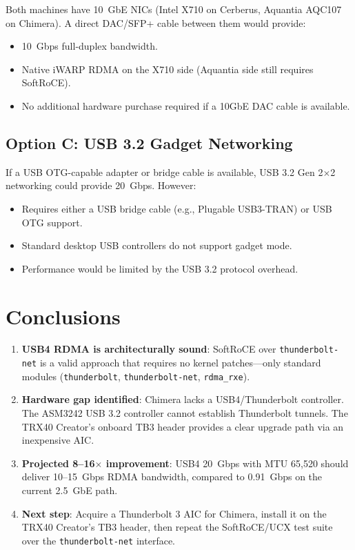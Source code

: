 \documentclass[11pt,letterpaper]{article}
\begin{document}
Both machines have 10~GbE NICs (Intel X710 on Cerberus, Aquantia AQC107 on Chimera). A direct DAC/SFP+ cable between them would provide:

\begin{itemize}
    \item 10~Gbps full-duplex bandwidth.
    \item Native iWARP RDMA on the X710 side (Aquantia side still requires SoftRoCE).
    \item No additional hardware purchase required if a 10GbE DAC cable is available.
\end{itemize}

\subsection{Option C: USB 3.2 Gadget Networking}

If a USB OTG-capable adapter or bridge cable is available, USB 3.2 Gen 2$\times$2 networking could provide 20~Gbps. However:
\begin{itemize}
    \item Requires either a USB bridge cable (e.g., Plugable USB3-TRAN) or USB OTG support.
    \item Standard desktop USB controllers do not support gadget mode.
    \item Performance would be limited by the USB 3.2 protocol overhead.
\end{itemize}

\section{Conclusions}

\begin{enumerate}
    \item \textbf{USB4 RDMA is architecturally sound}: SoftRoCE over \texttt{thunderbolt-net} is a valid approach that requires no kernel patches---only standard modules (\texttt{thunderbolt}, \texttt{thunderbolt-net}, \texttt{rdma\_rxe}).

    \item \textbf{Hardware gap identified}: Chimera lacks a USB4/Thunderbolt controller. The ASM3242 USB 3.2 controller cannot establish Thunderbolt tunnels. The TRX40 Creator's onboard TB3 header provides a clear upgrade path via an inexpensive AIC.

    \item \textbf{Projected 8--16$\times$ improvement}: USB4 20~Gbps with MTU 65,520 should deliver 10--15~Gbps RDMA bandwidth, compared to 0.91~Gbps on the current 2.5~GbE path.

    \item \textbf{Next step}: Acquire a Thunderbolt 3 AIC for Chimera, install it on the TRX40 Creator's TB3 header, then repeat the SoftRoCE/UCX test suite over the \texttt{thunderbolt-net} interface.
\end{enumerate}
\end{document}
